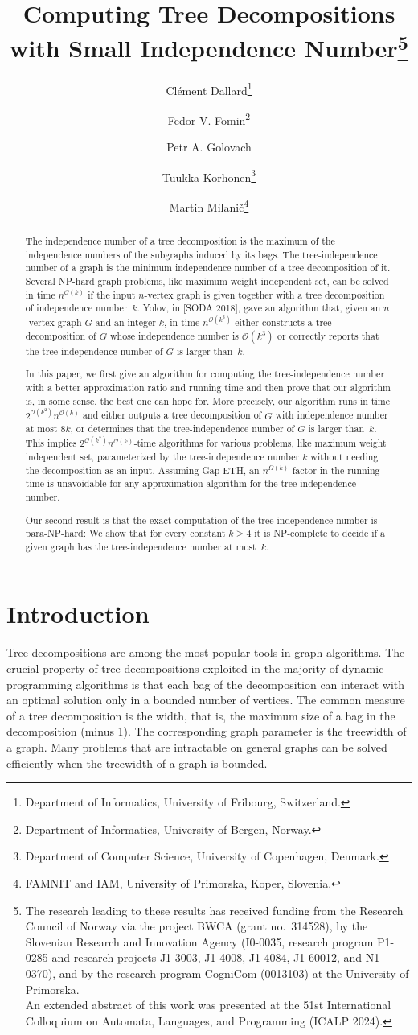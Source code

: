 \documentclass[11pt]{article}
\date{}
\author{
Cl\'{e}ment Dallard\thanks{
Department of Informatics, University of Fribourg, Switzerland.}
\and
Fedor V. Fomin\thanks{
Department of Informatics, University of Bergen, Norway.}
\and
Petr A. Golovach\addtocounter{footnote}{-1}\footnotemark{}
\and
Tuukka Korhonen\thanks{Department of Computer Science, University of Copenhagen, Denmark.}
\and
Martin Milani{\v c}\thanks{FAMNIT and IAM, University of Primorska, Koper, Slovenia.}
}
\title{Computing Tree Decompositions with Small Independence Number\thanks{The research leading to these results has received funding from the Research Council of Norway via the project BWCA (grant no.\ 314528), by the  Slovenian Research and Innovation Agency (I0-0035, research program P1-0285 and research projects J1-3003, J1-4008, J1-4084, J1-60012, and N1-0370), and by the research program CogniCom (0013103) at the University of Primorska.\\
An extended abstract of this work was presented at the 51st International Colloquium on Automata, Languages, and Programming (ICALP 2024).}
}
\theoremstyle{definition}
\newcommand{\NP}{\textup{\textsf{NP}}}
\newcommand{\parNP}{\textup{\textsf{para-NP}}}
\newcommand{\OO}{\mathcal{O}}
\begin{document}
\maketitle



\begin{abstract}
The independence number of a tree decomposition is the maximum of the independence numbers of the subgraphs induced by its bags.
The tree-independence number of a graph is the minimum independence number of a tree decomposition of it.
Several \NP-hard graph problems, like maximum weight independent set, can be solved in time $n^{\OO(k)}$ if the input $n$-vertex graph is given together with a tree decomposition of independence number~$k$.
Yolov, in [SODA 2018], gave an algorithm that, given an $n$-vertex graph $G$ and an integer $k$, in time
$n^{\OO(k^3)}$ either constructs a tree decomposition of $G$ whose independence number is $\OO(k^3)$ or correctly reports that
the tree-independence number of $G$ is larger than~$k$.


In this paper, we first give an algorithm for computing the tree-independence number with a better approximation ratio and running time and then prove that our algorithm is, in some sense, the best one can hope for.
More precisely, our algorithm runs in time $2^{\OO(k^2)} n^{\OO(k)}$ and either outputs a tree decomposition of $G$ with independence number at most $8k$, or determines that the tree-independence number of $G$ is larger than~$k$.
This implies $2^{\OO(k^2)} n^{\OO(k)}$-time algorithms for various problems, like maximum weight independent set, parameterized by the tree-independence number $k$ without needing the decomposition as an input.
Assuming Gap-ETH, an $n^{\Omega(k)}$ factor in the running time is unavoidable for any approximation algorithm for the tree-independence number.

Our second result is that the exact computation of the tree-independence number is \parNP-hard: We show that for every constant $k \ge 4$ it is \NP-complete to decide if a given graph has the tree-independence number at most~$k$.
\end{abstract}



\section{Introduction}

Tree decompositions are among the most popular tools in graph algorithms.
The crucial property of tree decompositions exploited in the majority of dynamic programming algorithms is that each bag of the decomposition can interact with an optimal solution only in a bounded number of vertices. The common measure of a tree decomposition is the width, that is,  the maximum size of a bag in the decomposition (minus 1). The corresponding graph parameter is the treewidth of a graph.
Many problems that are intractable on general graphs can be solved efficiently when the treewidth of a graph is bounded.
\end{document}
